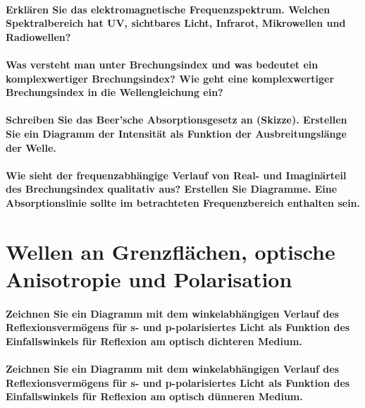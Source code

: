 \documentclass[a4paper, 11pt, parskip=half]{scrartcl}
\begin{document}
\paragraph{Erklären Sie das elektromagnetische Frequenzspektrum. Welchen Spektralbereich hat UV,
sichtbares Licht, Infrarot, Mikrowellen und Radiowellen?}

\paragraph{Was versteht man unter Brechungsindex und was bedeutet ein komplexwertiger
Brechungsindex? Wie geht eine komplexwertiger Brechungsindex in die Wellengleichung ein?}

\paragraph{Schreiben Sie das Beer’sche Absorptionsgesetz an (Skizze). Erstellen Sie ein Diagramm der
Intensität als Funktion der Ausbreitungslänge der Welle.}

\paragraph{Wie sieht der frequenzabhängige Verlauf von Real- und Imaginärteil des Brechungsindex
qualitativ aus? Erstellen Sie Diagramme. Eine Absorptionslinie sollte im betrachteten
Frequenzbereich enthalten sein.}

\newpage

\section{Wellen an Grenzflächen, optische Anisotropie und Polarisation}

\paragraph{Zeichnen Sie ein Diagramm mit dem winkelabhängigen Verlauf des Reflexionsvermögens für s-
und p-polarisiertes Licht als Funktion des Einfallswinkels für Reflexion am optisch dichteren
Medium.}

\paragraph{Zeichnen Sie ein Diagramm mit dem winkelabhängigen Verlauf des Reflexionsvermögens für s-
und p-polarisiertes Licht als Funktion des Einfallswinkels für Reflexion am optisch dünneren
Medium.}
\end{document}
